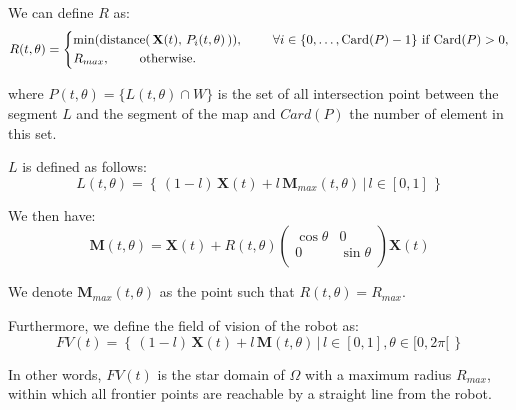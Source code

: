 \documentclass[../main.tex]{subfiles}
\begin{document}
\vspace{0.5em}

We can define $R$ as: 
\begin{equation*}
	\displaystyle
	R(t, \theta) = 
	\begin{cases*}
		\min(\text{\rmfamily distance}( \, \mathbf{X}(t), \, P_i(t, \theta) \,)),~~~~~~~ \forall i \in \{0, \ldots, \text{\rmfamily Card}(P) - 1\} ~\text{\rmfamily if Card}(P) > 0,\\
		R_{max}, ~~~~~~~\text{\rmfamily otherwise}.
	\end{cases*}
\end{equation*}
\vspace{0.5em}


where $P(t, \theta) = \{L(t, \theta) \cap W\}$ is the set of all intersection point between the segment $L$ and the segment of the map and $Card(P)$ the number of element in this set.
\vspace{0.5em}

$L$ is defined as follows:
\begin{equation*}
	\displaystyle
	L(t, \theta) = \left\{ \, (1 - l) \, \mathbf{X}(t) + l\, \mathbf{M}_{max}(t, \theta) \,|\, l \in [0, 1]\, \right\}
\end{equation*}

We then have:
\begin{equation*}
	\displaystyle
	\mathbf{M}(t, \theta) = \mathbf{X}(t) + R(t, \theta) 
	\begin{pmatrix}
		\cos \theta & 0\\
		0 & \sin \theta\\
	\end{pmatrix} 
	\mathbf{X}(t)
\end{equation*}

We denote $\mathbf{M}_{max} (t, \theta)$ as the point such that $R(t, \theta) = R_{max}$.
\vspace{0.5em}

Furthermore, we define the field of vision of the robot as:
\begin{equation}
	\displaystyle
	FV(t) = \left\{ \, (1 - l) \, \mathbf{X}(t) + l\, \mathbf{M}(t, \theta) \,|\, l \in [0, 1], \theta \in [0, 2 \pi[ \, \right\}
\end{equation}

In other words, $FV(t)$ is the star domain of $\Omega$ with a maximum radius $R_{max}$, within which all frontier points are reachable by a straight line from the robot.

\vspace{0.5em}
\end{document}
